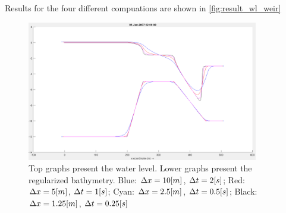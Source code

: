Results for the four different compuations are shown in \autoref{fig:result_wl_weir}
\begin{figure}[H]
    \centering
    \includegraphics[width=0.9\textwidth]{figures/Screenshot 2025-03-30 214406.png}
    \caption{Top graphs present the water level. Lower graphs present the regularized bathymetry. Blue: $\Delta x = 10 [m]$, $\Delta t = 2 [s]$;
    Red: $\Delta x = 5 [m]$, $\Delta t = 1 [s]$;
    Cyan: $\Delta x = 2.5 [m]$, $\Delta t = 0.5 [s]$;
    Black: $\Delta x = 1.25 [m]$, $\Delta t = 0.25 [s]$}
    \label{fig:result_wl_weir}
\end{figure}